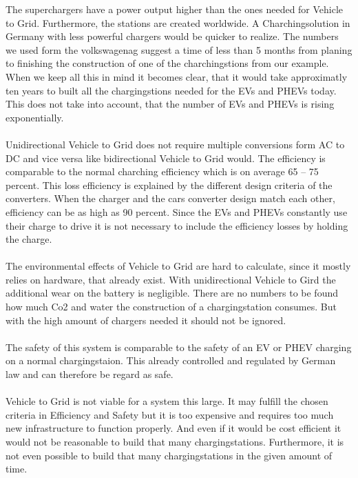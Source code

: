 \documentclass[12pt,a4paper]{article}
\begin{document}
\begin{parcolumns}[colwidths={1=2.5 cm, 2=10 cm, 3=2.5cm}]{3}
{%
The superchargers have a power output higher than the ones needed for Vehicle to Grid. Furthermore, the stations are created worldwide. A Charchingsolution in Germany with less powerful chargers would be quicker to realize. The numbers we used form the volkswagenag suggest a time of less than 5 months from planing to finishing the construction of one of the charchingstions from our example. When we keep all this in mind it becomes clear, that it would take approximatly ten years to built all the chargingstions needed for the EVs and PHEVs today. This does not take into account, that the number of EVs and PHEVs is rising exponentially.
\\ \\
\noindent
Unidirectional Vehicle to Grid does not require multiple conversions form AC to DC and vice versa like bidirectional Vehicle to Grid would. The efficiency is comparable to the normal charching efficiency which is on average 65 – 75 percent. This loss efficiency is explained by the different design criteria of the converters. When the charger and the cars converter design match each other, efficiency can be as high as 90 percent. Since the EVs and PHEVs constantly use their charge to drive it is not necessary to include the efficiency losses by holding the charge.%
\\ \\
\noindent
The environmental effects of Vehicle to Grid are hard to calculate, since it mostly relies on hardware, that already exist. With unidirectional Vehicle to Gird the additional wear on the battery is negligible. There are no numbers to be found how much Co2 and water the construction of a chargingstation consumes. But with the high amount of chargers needed it should not be ignored.
\\ \\
\noindent
The safety of this system is comparable to the safety of an EV or PHEV charging on a normal chargingstaion. This already controlled and regulated by German law and can therefore be regard as safe.%
\\ \\
\noindent
Vehicle to Grid is not viable for a system this large. It may fulfill the chosen criteria in Efficiency and Safety but it is too expensive and requires too much new infrastructure to function properly. And even if it would be cost efficient it would not be reasonable to build that many chargingstations. Furthermore, it is not even possible to build that many chargingstations in the given amount of time.
}
\end{parcolumns}
\end{document}
